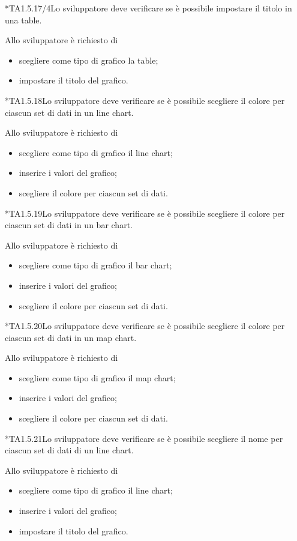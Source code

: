 	*{TA1.5.17/4}Lo sviluppatore deve verificare se è possibile impostare il titolo in una table.

		Allo sviluppatore è richiesto di
		\begin{itemize}
			\item scegliere come tipo di grafico la table;
			\item impostare il titolo del grafico.
		\end{itemize}

	*{TA1.5.18}Lo sviluppatore deve verificare se è possibile scegliere il colore per ciascun set di dati in un line chart.

		Allo sviluppatore è richiesto di
		\begin{itemize}
			\item scegliere come tipo di grafico il line chart;
			\item inserire i valori del grafico;
			\item scegliere il colore per ciascun set di dati.
		\end{itemize}

	*{TA1.5.19}Lo sviluppatore deve verificare se è possibile scegliere il colore per ciascun set di dati in un bar chart.

		Allo sviluppatore è richiesto di
		\begin{itemize}
			\item scegliere come tipo di grafico il bar chart;
			\item inserire i valori del grafico;
			\item scegliere il colore per ciascun set di dati.
		\end{itemize}

	*{TA1.5.20}Lo sviluppatore deve verificare se è possibile scegliere il colore per ciascun set di dati in un map chart.

		Allo sviluppatore è richiesto di
		\begin{itemize}
			\item scegliere come tipo di grafico il map chart;
			\item inserire i valori del grafico;
			\item scegliere il colore per ciascun set di dati.
		\end{itemize}

	*{TA1.5.21}Lo sviluppatore deve verificare se è possibile scegliere il nome per ciascun set di dati di un line chart.

		Allo sviluppatore è richiesto di
		\begin{itemize}
			\item scegliere come tipo di grafico il line chart;
			\item inserire i valori del grafico;
			\item impostare il titolo del grafico.
		\end{itemize}


